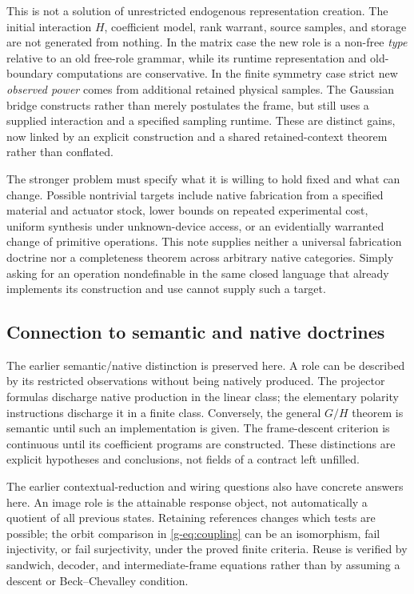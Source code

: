 \documentclass[11pt]{article}
\theoremstyle{definition}
\theoremstyle{remark}
\begin{document}
This is not a solution of unrestricted endogenous representation creation. The initial interaction $H$, coefficient model, rank warrant, source samples, and storage are not generated from nothing. In the matrix case the new role is a non-free \emph{type} relative to an old free-role grammar, while its runtime representation and old-boundary computations are conservative. In the finite symmetry case strict new \emph{observed power} comes from additional retained physical samples. The Gaussian bridge constructs rather than merely postulates the frame, but still uses a supplied interaction and a specified sampling runtime. These are distinct gains, now linked by an explicit construction and a shared retained-context theorem rather than conflated.

The stronger problem must specify what it is willing to hold fixed and what can change. Possible nontrivial targets include native fabrication from a specified material and actuator stock, lower bounds on repeated experimental cost, uniform synthesis under unknown-device access, or an evidentially warranted change of primitive operations. This note supplies neither a universal fabrication doctrine nor a completeness theorem across arbitrary native categories. Simply asking for an operation nondefinable in the same closed language that already implements its construction and use cannot supply such a target.

\subsection{Connection to semantic and native doctrines}
The earlier semantic/native distinction is preserved here. A role can be described by its restricted observations without being natively produced. The projector formulas discharge native production in the linear class; the elementary polarity instructions discharge it in a finite class. Conversely, the general $G/H$ theorem is semantic until such an implementation is given. The frame-descent criterion is continuous until its coefficient programs are constructed. These distinctions are explicit hypotheses and conclusions, not fields of a contract left unfilled.

The earlier contextual-reduction and wiring questions also have concrete answers here. An image role is the attainable response object, not automatically a quotient of all previous states. Retaining references changes which tests are possible; the orbit comparison in \eqref{g-eq:coupling} can be an isomorphism, fail injectivity, or fail surjectivity, under the proved finite criteria. Reuse is verified by sandwich, decoder, and intermediate-frame equations rather than by assuming a descent or Beck--Chevalley condition.
\end{document}

